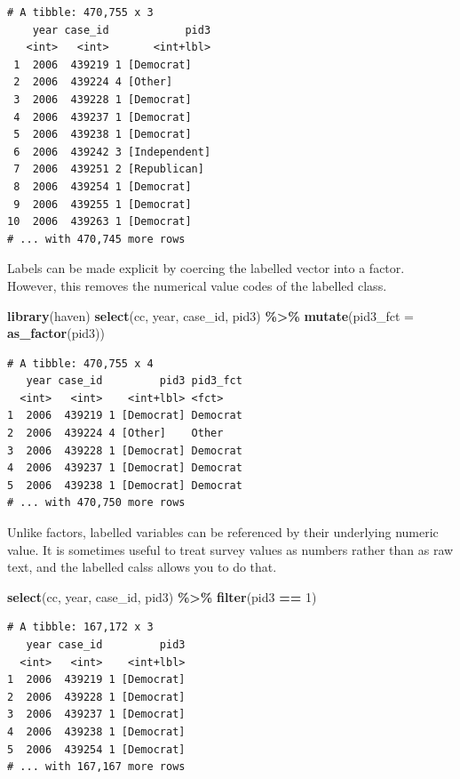 \documentclass[10pt,article,oneside]{memoir}
\theoremstyle{definition}
\newenvironment{Shaded}{\begin{snugshade}}{\end{snugshade}}
\newcommand{\DataTypeTok}[1]{\textcolor[rgb]{0.13,0.29,0.53}{#1}}
\newcommand{\DecValTok}[1]{\textcolor[rgb]{0.00,0.00,0.81}{#1}}
\newcommand{\KeywordTok}[1]{\textcolor[rgb]{0.13,0.29,0.53}{\textbf{#1}}}
\newcommand{\NormalTok}[1]{#1}
\newcommand{\OperatorTok}[1]{\textcolor[rgb]{0.81,0.36,0.00}{\textbf{#1}}}
\newcommand{\StringTok}[1]{\textcolor[rgb]{0.31,0.60,0.02}{#1}}
\begin{document}
\begin{verbatim}
# A tibble: 470,755 x 3
    year case_id            pid3
   <int>   <int>       <int+lbl>
 1  2006  439219 1 [Democrat]   
 2  2006  439224 4 [Other]      
 3  2006  439228 1 [Democrat]   
 4  2006  439237 1 [Democrat]   
 5  2006  439238 1 [Democrat]   
 6  2006  439242 3 [Independent]
 7  2006  439251 2 [Republican] 
 8  2006  439254 1 [Democrat]   
 9  2006  439255 1 [Democrat]   
10  2006  439263 1 [Democrat]   
# ... with 470,745 more rows
\end{verbatim}

\noindent Labels can be made explicit by coercing the labelled vector
into a factor. However, this removes the numerical value codes of the
labelled class.

\begin{Shaded}
\begin{Highlighting}[]
\KeywordTok{library}\NormalTok{(haven)}
\KeywordTok{select}\NormalTok{(cc, year, case\_id, pid3) }\OperatorTok{\%>\%}\StringTok{ }
\StringTok{  }\KeywordTok{mutate}\NormalTok{(}\DataTypeTok{pid3\_fct =} \KeywordTok{as\_factor}\NormalTok{(pid3))}
\end{Highlighting}
\end{Shaded}

\begin{verbatim}
# A tibble: 470,755 x 4
   year case_id         pid3 pid3_fct
  <int>   <int>    <int+lbl> <fct>   
1  2006  439219 1 [Democrat] Democrat
2  2006  439224 4 [Other]    Other   
3  2006  439228 1 [Democrat] Democrat
4  2006  439237 1 [Democrat] Democrat
5  2006  439238 1 [Democrat] Democrat
# ... with 470,750 more rows
\end{verbatim}

\noindent Unlike factors, labelled variables can be referenced by their
underlying numeric value. It is sometimes useful to treat survey values
as numbers rather than as raw text, and the labelled calss allows you to
do that.

\begin{Shaded}
\begin{Highlighting}[]
\KeywordTok{select}\NormalTok{(cc, year, case\_id, pid3) }\OperatorTok{\%>\%}\StringTok{ }
\StringTok{  }\KeywordTok{filter}\NormalTok{(pid3 }\OperatorTok{==}\StringTok{ }\DecValTok{1}\NormalTok{)}
\end{Highlighting}
\end{Shaded}

\begin{verbatim}
# A tibble: 167,172 x 3
   year case_id         pid3
  <int>   <int>    <int+lbl>
1  2006  439219 1 [Democrat]
2  2006  439228 1 [Democrat]
3  2006  439237 1 [Democrat]
4  2006  439238 1 [Democrat]
5  2006  439254 1 [Democrat]
# ... with 167,167 more rows
\end{verbatim}
\end{document}
